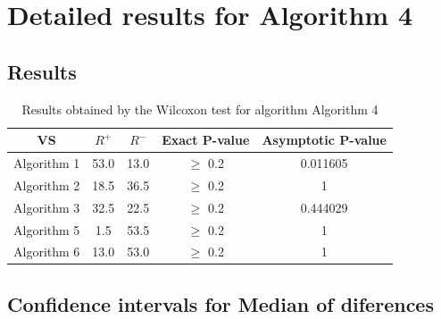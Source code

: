 \documentclass[a4paper,10pt]{article}
\begin{document}
 \clearpage 


\section{Detailed results for Algorithm 4}


\subsection{Results}

\begin{table}[!htp]
\centering\small
\begin{tabular}{
|c|c|c|c|c|}
\hline
 VS & $R^{+}$ & $R^{-}$ & Exact P-value & Asymptotic P-value \\ \hline 
Algorithm 1 & 53.0 & 13.0 & $\geq$ 0.2 & 0.011605\\ \hline 
Algorithm 2 & 18.5 & 36.5 & $\geq$ 0.2 & 1\\ \hline 
Algorithm 3 & 32.5 & 22.5 & $\geq$ 0.2 & 0.444029\\ \hline 
Algorithm 5 & 1.5 & 53.5 & $\geq$ 0.2 & 1\\ \hline 
Algorithm 6 & 13.0 & 53.0 & $\geq$ 0.2 & 1\\ \hline 

\end{tabular}
\caption{Results obtained by the Wilcoxon test for algorithm Algorithm 4}
\end{table}

\subsection{Confidence intervals for Median of diferences}
\end{document}
